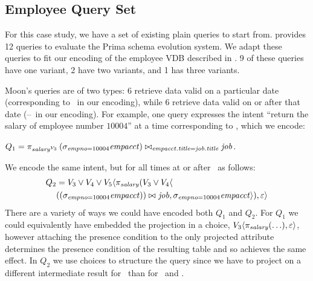\subsection{Employee Query Set}
\label{sec:emp-qs}


For this case study, we have a set of existing plain queries to start from.
\citet{prima08Moon} provides 12 queries to evaluate the Prima schema evolution
system. We adapt these queries to fit our encoding of the employee VDB
described in .
%
%
9 of these queries have one variant, 2 have two variants, and 1 has three
variants. 


Moon's queries are of two types: 6 retrieve data valid on a particular date
(corresponding to \vThree\ in our encoding), while 6 retrieve data valid on or
after that date (\vThree--\vFive\ in our encoding).
%
For example, one query expresses the intent ``return the salary of employee
number $10004$'' at a time corresponding to \vThree, which we encode:
\centerline{
\ensuremath{
Q_1 = \vPrj[\oatt{\salary}{\vThree}]{%
  \joinRelR{\selectRel{\empno=10004}{\empacct}}{\job}
           {\empacct.\titleatt = \job.\titleatt}}
}.}
%
%
We encode the same intent, but for all times at or after \vThree\ as follows:
%
\begin{align*}
Q_2 &=  \vThree\vee\vFour\vee\vFive \langle \pi_\salary 
 (\vThree\vee\vFour\langle\\
&    \joinRelR{(\vSel[\empno=10004]{\empacct})}{\job}
             {}, 
{\vSel[\empno=10004]{\empacct}}\rangle), \empRel\rangle
\end{align*}
%
There are a variety of ways we could have encoded both $Q_1$ and $Q_2$.
%
For $Q_1$ we could equivalently have embedded the projection in a choice,
$\chc[\vThree]{\vPrj[\salary]{(\ldots)},\empRel}$, however attaching the presence
condition to the only projected attribute determines the presence condition of
the resulting table and so achieves the same effect.
%
In $Q_2$ we use choices to structure the query since we have to project on a
different intermediate result for \vFive\ than for \vThree\ and \vFour.


